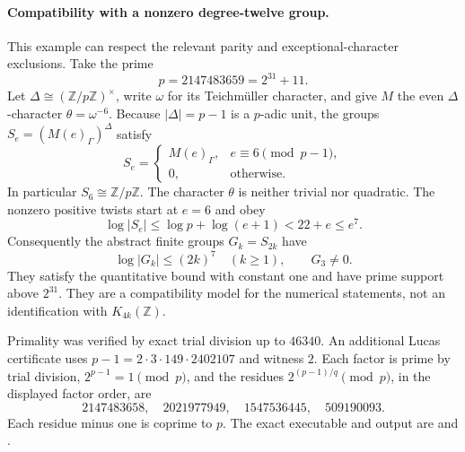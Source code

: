 \documentclass[11pt,a4paper]{article}
\theoremstyle{definition}
\begin{document}
\paragraph{Compatibility with a nonzero degree-twelve group.}
This example can respect the relevant parity and exceptional-character
exclusions.  Take the prime
\[
 p=2147483659=2^{31}+11.
\]
Let $\Delta\cong(\mathbb Z/p\mathbb Z)^\times$, write $\omega$
for its Teichm\"uller character, and give $M$ the even
$\Delta$-character $\theta=\omega^{-6}$.
Because $|\Delta|=p-1$ is a $p$-adic unit, the groups
$S_e=(M(e)_\Gamma)^\Delta$ satisfy
\[
 S_e=
 \begin{cases}
  M(e)_\Gamma,&e\equiv6\pmod{p-1},\\
  0,&\text{otherwise}.
 \end{cases}
 \tag{HU.8}
\]
In particular $S_6\cong\mathbb Z/p\mathbb Z$.
The character $\theta$ is neither trivial nor quadratic.
The nonzero positive twists start at $e=6$ and obey
\[
 \log|S_e|\le\log p+\log(e+1)<22+e\le e^7.
\]
Consequently the abstract finite groups $G_k=S_{2k}$ have
\[
 \log|G_k|\le(2k)^7\quad(k\ge1),\qquad G_3\ne0.
 \tag{HU.9}
\]
They satisfy the quantitative bound with constant one and have
prime support above $2^{31}$.  They are a compatibility model
for the numerical statements, not an identification with
$K_{4k}(\mathbb Z)$.

Primality was verified by exact trial division up to $46340$.
An additional Lucas certificate uses
$p-1=2\cdot3\cdot149\cdot2402107$ and witness $2$.
Each factor is prime by trial division,
$2^{p-1}=1\pmod p$, and the residues
$2^{(p-1)/q}\pmod p$, in the displayed factor order, are
\[
 2147483658,\quad2021977949,\quad1547536445,\quad509190093.
\]
Each residue minus one is coprime to $p$.
The exact executable and output are
 and
.
\end{document}
